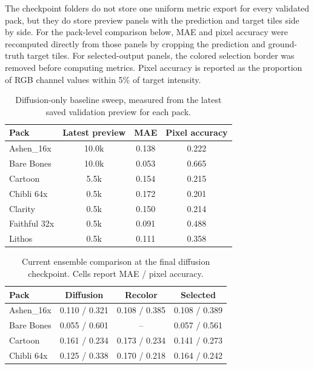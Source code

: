 The checkpoint folders do not store one uniform metric export for every
validated pack, but they do store preview panels with the prediction and target
tiles side by side. For the pack-level comparison below, MAE and pixel accuracy
were recomputed directly from those panels by cropping the prediction and
ground-truth target tiles. For selected-output panels, the colored selection
border was removed before computing metrics. Pixel accuracy is reported as the
proportion of RGB channel values within 5\% of target intensity.

\begin{table}[htbp]
    \centering
    \caption{Diffusion-only baseline sweep, measured from the latest saved validation preview for each pack.}
    \label{tab:baseline-results}
    \begin{tabular}{@{}lccc@{}}
        \toprule
        Pack & Latest preview & MAE & Pixel accuracy \\
        \midrule
        Ashen\_16x & 10.0k & 0.138 & 0.222 \\
        Bare Bones & 10.0k & 0.053 & 0.665 \\
        Cartoon & 5.5k & 0.154 & 0.215 \\
        Chibli 64x & 0.5k & 0.172 & 0.201 \\
        Clarity & 0.5k & 0.150 & 0.214 \\
        Faithful 32x & 0.5k & 0.091 & 0.488 \\
        Lithos & 0.5k & 0.111 & 0.358 \\
        \bottomrule
    \end{tabular}
\end{table}

\begin{table}[htbp]
    \centering
    \caption{Current ensemble comparison at the final diffusion checkpoint. Cells report MAE / pixel accuracy.}
    \label{tab:current-results}
    \begin{tabular}{@{}lccc@{}}
        \toprule
        Pack & Diffusion & Recolor & Selected \\
        \midrule
        Ashen\_16x & 0.110 / 0.321 & 0.108 / 0.385 & 0.108 / 0.389 \\
        Bare Bones & 0.055 / 0.601 & -- & 0.057 / 0.561 \\
        Cartoon & 0.161 / 0.234 & 0.173 / 0.234 & 0.141 / 0.273 \\
        Chibli 64x & 0.125 / 0.338 & 0.170 / 0.218 & 0.164 / 0.242 \\
        \bottomrule
    \end{tabular}
\end{table}


